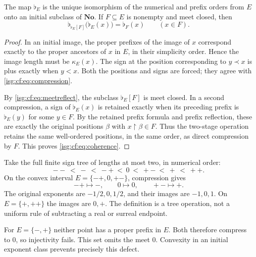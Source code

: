 \documentclass[11pt]{article}
\theoremstyle{definition}
\theoremstyle{remark}
\newcommand{\No}{\ensuremath{\mathbf{No}}}
\newcommand{\pr}{\mathrel{\prec}}
\newcommand{\cmp}[1]{\flat_{#1}}
\begin{document}
\begin{proposition}\label{isg:cf:prop:coherence}
The map $\cmp E$ is the unique isomorphism of the numerical and prefix
orders from $E$ onto an initial subclass of $\No$. If $F\subseteq E$
is nonempty and meet closed, then
\begin{equation}\label{isg:cf:eq:coherence}
 \cmp{\cmp E[F]}\bigl(\cmp E(x)\bigr)=\cmp F(x)
 \qquad(x\in F).
\end{equation}
\end{proposition}
\begin{proof}
In an initial image, the proper prefixes of the image of $x$ correspond
exactly to the proper ancestors of $x$ in $E$, in their simplicity
order. Hence the image length must be $\kappa_E(x)$. The sign at the
position corresponding to $y\pr x$ is plus exactly when $y<x$.
Both the positions and signs are forced; they agree with
\eqref{isg:cf:eq:compression}.

By \eqref{isg:cf:eq:meetreflect}, the subclass $\cmp E[F]$ is meet closed.
In a second compression, a sign of $\cmp E(x)$ is retained exactly
when its preceding prefix is $\cmp E(y)$ for some $y\in F$.
By the retained prefix formula and prefix reflection, these are exactly
the original positions $\beta$ with $x\restriction\beta\in F$.
Thus the two-stage operation retains the same well-ordered positions,
in the same order, as direct compression by $F$. This proves
\eqref{isg:cf:eq:coherence}.
\end{proof}

\begin{example}\label{isg:cf:ex:compression}
Take the full finite sign tree of lengths at most two, in numerical order:
\[
 --\ <\ -\ <\ -+\ <\ 0\ <\ +-\ <\ +\ <\ ++.
\]
On the convex interval $E=\{-+,0,+-\}$, compression gives
\[
 -+\longmapsto -,
 \qquad 0\longmapsto0,
 \qquad +-\longmapsto+.
\]
The original exponents are $-1/2,0,1/2$, and their images are $-1,0,1$.
On $E=\{+,++\}$ the images are $0,+$. The definition is a tree operation,
not a uniform rule of subtracting a real or surreal endpoint.
\end{example}

\begin{example}\label{isg:cf:ex:badmeet}
For $E=\{-,+\}$ neither point has a proper prefix in $E$. Both therefore
compress to $0$, so injectivity fails. This set omits the meet $0$.
Convexity in an initial exponent class prevents precisely this defect.
\end{example}
\end{document}
